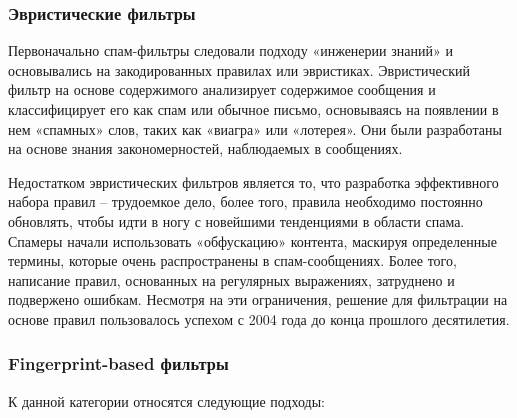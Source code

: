 \subsubsection{Эвристические фильтры}
    Первоначально спам-фильтры следовали подходу «инженерии знаний» и основывались 
    на закодированных правилах или эвристиках. Эвристический фильтр на основе содержимого анализирует содержимое сообщения 
    и классифицирует его как спам или обычное письмо, основываясь на появлении в нем «спамных» слов, таких 
    как «виагра» или «лотерея». Они были разработаны на основе знания закономерностей, наблюдаемых в 
    сообщениях.

    Недостатком эвристических фильтров является то, что разработка эффективного набора правил -- трудоемкое 
    дело, более того, правила необходимо постоянно обновлять, чтобы идти в ногу с новейшими тенденциями в 
    области спама. Спамеры начали использовать «обфускацию» контента, маскируя определенные термины, 
    которые очень распространены в спам-сообщениях. Более того, написание правил, основанных на регулярных 
    выражениях, затруднено и подвержено ошибкам. Несмотря на эти ограничения, решение для фильтрации на 
    основе правил пользовалось успехом с 2004 года до конца прошлого десятилетия.

\subsubsection{Fingerprint-based фильтры}
    К данной категории относятся следующие подходы:

